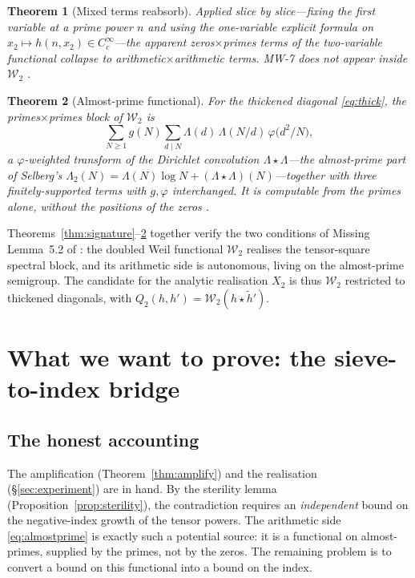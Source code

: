 \documentclass[11pt]{amsart}
\newtheorem{theorem}{Theorem}[section]
\theoremstyle{definition}
\theoremstyle{remark}
\newcommand{\Wtwo}{\mathcal{W}_2}
\newcommand{\La}{\Lambda}
\begin{document}
\begin{theorem}[Mixed terms reabsorb]\label{thm:mixed}
Applied slice by slice---fixing the first variable at a prime power $n$ and
using the one-variable explicit formula on $x_2\mapsto h(n,x_2)\in
C_c^\infty$---the apparent zeros$\times$primes terms of the two-variable
functional collapse to arithmetic$\times$arithmetic terms. MW-7 does not
appear inside $\Wtwo$ \cite[Thm~4.4]{P40}.
\end{theorem}

\begin{theorem}[Almost-prime functional]\label{thm:almostprime}
For the thickened diagonal \eqref{eq:thick}, the primes$\times$primes block
of $\Wtwo$ is
\begin{equation}\label{eq:almostprime}
\sum_{N\ge1} g(N)\sum_{d\mid N}\La(d)\,\La(N/d)\,\varphi\!\bigl(d^2/N\bigr),
\end{equation}
a $\varphi$-weighted transform of the Dirichlet convolution
$\La\star\La$---the almost-prime part of Selberg's
$\La_2(N)=\La(N)\log N+(\La\star\La)(N)$---together with three
finitely-supported terms with $g,\varphi$ interchanged. It is computable
from the primes alone, without the positions of the zeros
\cite[Thm~4.2]{P40}.
\end{theorem}

Theorems~\ref{thm:signature}--\ref{thm:almostprime} together verify the two
conditions of Missing Lemma~5.2 of \cite[]{P40}: the doubled Weil
functional $\Wtwo$ realises the tensor-square spectral block, and its
arithmetic side is autonomous, living on the almost-prime semigroup. The
candidate for the analytic realisation $X_2$ is thus
$\Wtwo$ restricted to thickened diagonals, with
$Q_2(h,h')=\Wtwo(h\star\tilde h')$.

\section{What we want to prove: the sieve-to-index bridge}\label{sec:bridge}

\subsection{The honest accounting}
The amplification (Theorem~\ref{thm:amplify}) and the realisation
(\S\ref{sec:experiment}) are in hand. By the sterility lemma
(Proposition~\ref{prop:sterility}), the contradiction requires an
\emph{independent} bound on the negative-index growth of the tensor powers.
The arithmetic side \eqref{eq:almostprime} is exactly such a potential
source: it is a functional on almost-primes, supplied by the primes, not by
the zeros. The remaining problem is to convert a bound on this functional
into a bound on the index.
\end{document}
